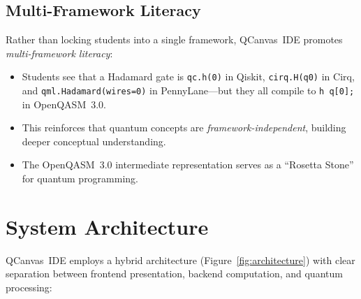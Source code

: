 \documentclass[conference]{IEEEtran}
\begin{document}
\subsection{Multi-Framework Literacy}

Rather than locking students into a single framework, QCanvas~IDE promotes \emph{multi-framework literacy}:

\begin{itemize}
    \item Students see that a Hadamard gate is \texttt{qc.h(0)} in Qiskit, \texttt{cirq.H(q0)} in Cirq, and \texttt{qml.Hadamard(wires=0)} in PennyLane---but they all compile to \texttt{h q[0];} in OpenQASM~3.0.
    \item This reinforces that quantum concepts are \emph{framework-independent}, building deeper conceptual understanding.
    \item The OpenQASM~3.0 intermediate representation serves as a ``Rosetta Stone'' for quantum programming.
\end{itemize}

\section{System Architecture}
\label{sec:architecture}

QCanvas~IDE employs a hybrid architecture (Figure~\ref{fig:architecture}) with clear separation between frontend presentation, backend computation, and quantum processing:
\end{document}
